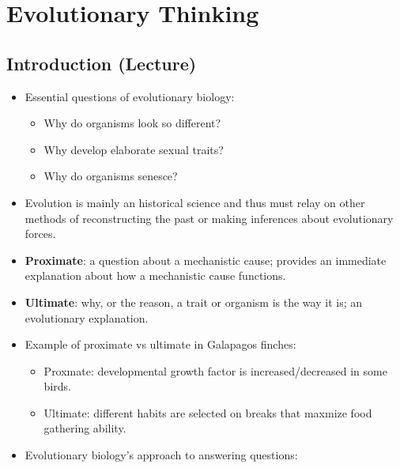 \documentclass[12pt,a4paper]{article}
\begin{document}
\tableofcontents
\cleardoublepage
\fancyhead{}

\clearpage
\clearpage
\section{Evolutionary Thinking}
\subsection{Introduction (Lecture)}
\begin{itemize}
    \item Essential questions of evolutionary biology: 
        \begin{itemize}
            \item Why do organisms look so different?
            \item Why develop elaborate sexual traits?
            \item Why do organisms senesce?
        \end{itemize}
    \item Evolution is mainly an historical science and thus must relay on other methods of reconstructing the past or making inferences about evolutionary forces. 
    \item \textbf{Proximate}: a question about a mechanistic cause; provides an immediate explanation about {\color{o-Sun}how} a mechanistic cause functions.
    \item \textbf{Ultimate}: {\color{o-Sun}why}, or the reason, a trait or organism is the way it is; an evolutionary explanation.
    \item Example of proximate vs ultimate in Galapagos finches: 
        \begin{itemize}
            \item Proxmate: developmental growth factor is increased/decreased in some birds.
            \item Ultimate: different habits are selected on breaks that maxmize food gathering ability.
        \end{itemize}
    \item Evolutionary biology's approach to answering questions:
        \begin{itemize}

\end{itemize}
\end{itemize}
\end{document}
